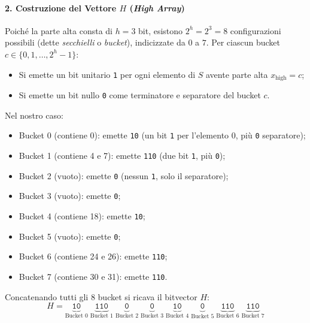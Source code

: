 \paragraph{2. Costruzione del Vettore $H$ (\textit{High Array})}
Poich\'e la parte alta consta di $h = 3$ bit, esistono $2^h = 2^3 = 8$ configurazioni possibili (dette \textit{secchielli} o \textit{bucket}), indicizzate da $0$ a $7$.
Per ciascun bucket $c \in \{0, 1, \dots, 2^h - 1\}$:
\begin{itemize}
  \item Si emette un bit unitario \texttt{1} per ogni elemento di $S$ avente parte alta $x_{\text{high}} = c$;
  \item Si emette un bit nullo \texttt{0} come terminatore e separatore del bucket $c$.
\end{itemize}

Nel nostro caso:
\begin{itemize}
  \item Bucket 0 (contiene 0): emette \texttt{10} (un bit \texttt{1} per l'elemento 0, pi\`u \texttt{0} separatore);
  \item Bucket 1 (contiene 4 e 7): emette \texttt{110} (due bit \texttt{1}, pi\`u \texttt{0});
  \item Bucket 2 (vuoto): emette \texttt{0} (nessun \texttt{1}, solo il separatore);
  \item Bucket 3 (vuoto): emette \texttt{0};
  \item Bucket 4 (contiene 18): emette \texttt{10};
  \item Bucket 5 (vuoto): emette \texttt{0};
  \item Bucket 6 (contiene 24 e 26): emette \texttt{110};
  \item Bucket 7 (contiene 30 e 31): emette \texttt{110}.
\end{itemize}

Concatenando tutti gli 8 bucket si ricava il bitvector $H$:
\begin{equation}
  H = \underbrace{\texttt{10}}_{\text{Bucket 0}} \; \underbrace{\texttt{110}}_{\text{Bucket 1}} \; \underbrace{\texttt{0}}_{\text{Bucket 2}} \; \underbrace{\texttt{0}}_{\text{Bucket 3}} \; \underbrace{\texttt{10}}_{\text{Bucket 4}} \; \underbrace{\texttt{0}}_{\text{Bucket 5}} \; \underbrace{\texttt{110}}_{\text{Bucket 6}} \; \underbrace{\texttt{110}}_{\text{Bucket 7}}
\end{equation}

